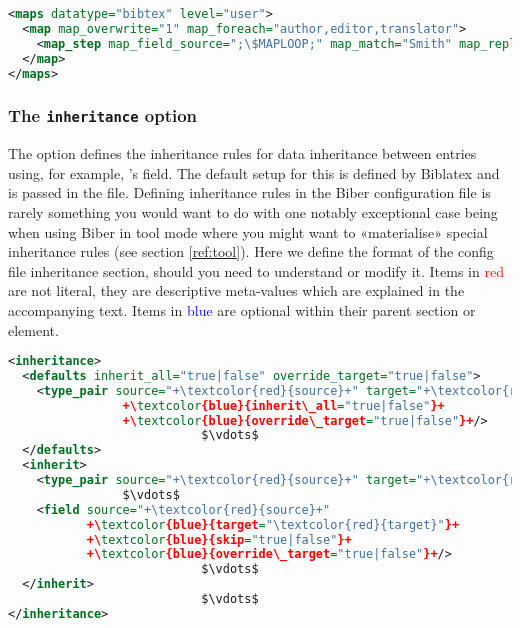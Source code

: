 \documentclass{ltxdockit}
\newcommand*{\biber}{Biber\xspace}
\newcommand*{\biblatex}{Biblatex\xspace}
\begin{document}
\begin{lstlisting}[language=xml,escapechar=;,mathescape=true]
<maps datatype="bibtex" level="user">
  <map map_overwrite="1" map_foreach="author,editor,translator">
    <map_step map_field_source=";\$MAPLOOP;" map_match="Smith" map_replace="Jones"/>
  </map>
</maps>
\end{lstlisting}

\bigskip
\subsubsection{The \texttt{inheritance} option}\label{inheritance}

The  option defines the inheritance rules for data
inheritance between entries using, for example, \bibtex's
 field. The default setup for this is defined by
\biblatex and is passed in the  file. Defining inheritance rules
in the \biber configuration file is rarely something you would want to do
with one notably exceptional case being when using \biber in tool mode
where you might want to «materialise» special inheritance rules (see
section \ref{ref:tool}). Here we define the format of the config file
inheritance section, should you need to understand or modify it. Items in
\textcolor{red}{red} are not literal, they are descriptive meta-values
which are explained in the accompanying text. Items in
\textcolor{blue}{blue} are optional within their parent section or element.

\begin{lstlisting}[language=xml,escapechar=+,mathescape=true]
<inheritance>
  <defaults inherit_all="true|false" override_target="true|false">
    <type_pair source="+\textcolor{red}{source}+" target="+\textcolor{red}{target}+"
                +\textcolor{blue}{inherit\_all="true|false"}+
                +\textcolor{blue}{override\_target="true|false"}+/>
                           $\vdots$
  </defaults>
  <inherit>
    <type_pair source="+\textcolor{red}{source}+" target="+\textcolor{red}{target}+"/>
                $\vdots$
    <field source="+\textcolor{red}{source}+"
           +\textcolor{blue}{target="\textcolor{red}{target}"}+
           +\textcolor{blue}{skip="true|false"}+
           +\textcolor{blue}{override\_target="true|false"}+/>
                           $\vdots$
  </inherit>
                           $\vdots$
</inheritance>
\end{lstlisting}
\end{document}
